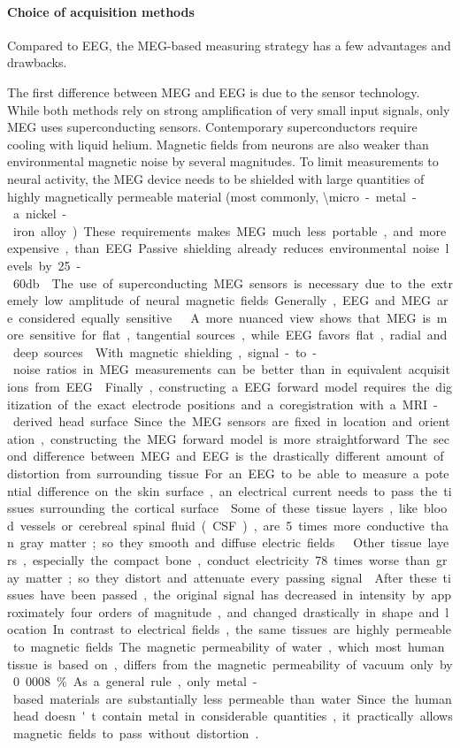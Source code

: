 \paragraph{Choice of acquisition methods}
Compared to EEG, the MEG-based measuring strategy has a few advantages and drawbacks.


The first difference between MEG and EEG is due to the sensor technology.
While both methods rely on strong amplification of very small input signals, only MEG uses superconducting sensors.
Contemporary superconductors require cooling with liquid helium.
Magnetic fields from neurons are also weaker than environmental magnetic noise by several magnitudes.
To limit measurements to neural activity, the MEG device needs to be shielded with large quantities of highly magnetically permeable material (most commonly, \SI{\micro}-metal - a nickel-iron alloy).
These requirements makes MEG much less portable, and more expensive, than EEG.
Passive shielding already reduces environmental noise levels by 25-60db \cite{1.5.SNR}.
The use of superconducting MEG sensors is necessary due to the extremely low amplitude of neural magnetic fields.
Generally, EEG and MEG are considered equally sensitive \cite{1.5.MEG.a}\cite{1.5.MEG.c}.
A more nuanced view shows that MEG is more sensitive for flat, tangential sources, while EEG favors flat, radial and deep sources \cite{1.5.sensitivity}.
With magnetic shielding, signal-to-noise ratios in MEG measurements can be better than in equivalent acquisitions from EEG \cite{1.5.SNR}.
Finally, constructing a EEG forward model requires the digitization of the exact electrode positions and a coregistration with a MRI-derived head surface.
Since the MEG sensors are fixed in location and orientation, constructing the MEG forward model is more straightforward.


The second difference between MEG and EEG is the drastically different amount of distortion from surrounding tissue.
For an EEG to be able to measure a potential difference on the skin surface, an electrical current needs to pass the tissues surrounding the cortical surface \cite{1.5.tissues.b}.
Some of these tissue layers, like blood vessels or cerebreal spinal fluid (CSF), are 5 times more conductive than gray matter; so they smooth and diffuse electric fields \cite{1.5.tissues.a}\cite{1.5.tissues.b}.
Other tissue layers, especially the compact bone, conduct electricity 78 times worse than gray matter; so they distort and attenuate every passing signal \cite{1.5.tissues.a}.
After these tissues have been passed, the original signal has decreased in intensity by approximately four orders of magnitude, and changed drastically in shape and location.
In contrast to electrical fields, the same tissues are highly permeable to magnetic fields.
The magnetic permeability of water, which most human tissue is based on, differs from the magnetic permeability of vacuum only by 0.0008\%.
As a general rule, only metal-based materials are substantially less permeable than water.
Since the human head doesn't contain metal in considerable quantities, it practically allows magnetic fields to pass without distortion \cite{1.5.tissues.a}.

